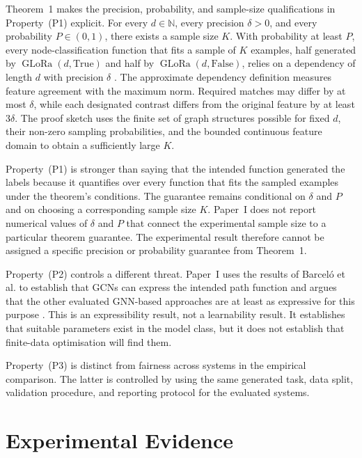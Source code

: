 Theorem~1 makes the precision, probability, and sample-size qualifications in Property~(P1) explicit.
For every $d\in\mathbb{N}$, every precision $\delta>0$, and every probability $P\in(0,1)$, there exists a sample size $K$.
With probability at least $P$, every node-classification function that fits a sample of $K$ examples, half generated by $\operatorname{GLoRa}(d,\mathrm{True})$ and half by $\operatorname{GLoRa}(d,\mathrm{False})$, relies on a dependency of length $d$ with precision $\delta$ \cite{zhou2025glora}.
The approximate dependency definition measures feature agreement with the maximum norm.
Required matches may differ by at most $\delta$, while each designated contrast differs from the original feature by at least $3\delta$.
The proof sketch uses the finite set of graph structures possible for fixed $d$, their non-zero sampling probabilities, and the bounded continuous feature domain to obtain a sufficiently large $K$.

Property~(P1) is stronger than saying that the intended function generated the labels because it quantifies over every function that fits the sampled examples under the theorem's conditions.
The guarantee remains conditional on $\delta$ and $P$ and on choosing a corresponding sample size $K$.
Paper~I does not report numerical values of $\delta$ and $P$ that connect the experimental sample size to a particular theorem guarantee.
The experimental result therefore cannot be assigned a specific precision or probability guarantee from Theorem~1.

Property~(P2) controls a different threat.
Paper~I uses the results of Barcel\'o et al. to establish that GCNs can express the intended path function and argues that the other evaluated GNN-based approaches are at least as expressive for this purpose \cite{barcelo2020logical,zhou2025glora}.
This is an expressibility result, not a learnability result.
It establishes that suitable parameters exist in the model class, but it does not establish that finite-data optimisation will find them.

Property~(P3) is distinct from fairness across systems in the empirical comparison.
The latter is controlled by using the same generated task, data split, validation procedure, and reporting protocol for the evaluated systems.

\section{Experimental Evidence}
\label{sec:glora-protocol}
\label{sec:glora-main-findings}

